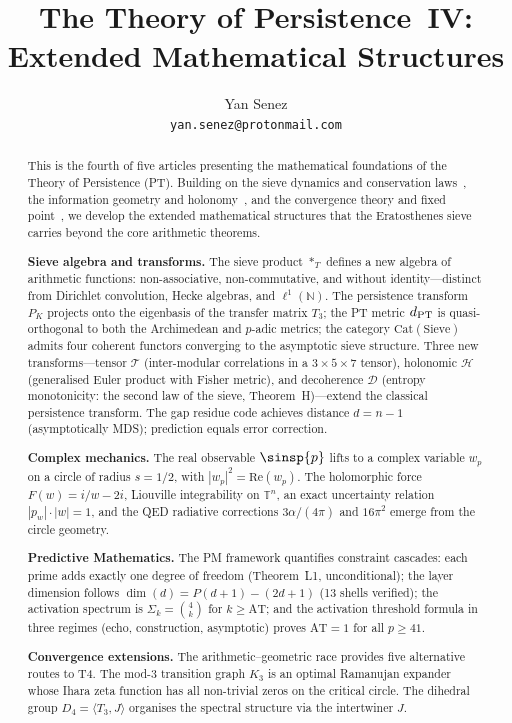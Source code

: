 \documentclass[12pt,a4paper]{article}
\title{\textbf{The Theory of Persistence~IV:\\Extended Mathematical Structures}}
\author{Yan Senez\\\texttt{yan.senez@protonmail.com}}
\date{}
\begin{document}
\maketitle

\begin{abstract}
This is the fourth of five articles presenting the mathematical
foundations of the Theory of Persistence (PT).  Building on the sieve
dynamics and conservation laws~\cite{companion_M1}, the information
geometry and holonomy~\cite{companion_M2}, and the convergence theory
and fixed point~\cite{companion_M3}, we develop the extended
mathematical structures that the Eratosthenes sieve carries beyond
the core arithmetic theorems.

\textbf{Sieve algebra and transforms.}
The sieve product $*_T$ defines a new algebra of arithmetic functions:
non-associative, non-commutative, and without identity---distinct from
Dirichlet convolution, Hecke algebras, and $\ell^1(\mathbb{N})$.  The
persistence transform $P_K$ projects onto the eigenbasis of the transfer
matrix $T_3$; the PT metric $d_{\rm PT}$ is quasi-orthogonal to both
the Archimedean and $p$-adic metrics; the category
$\mathrm{Cat}(\mathrm{Sieve})$ admits four coherent functors converging
to the asymptotic sieve structure.  Three new transforms---tensor
$\mathcal{T}$ (inter-modular correlations in a $3{\times}5{\times}7$
tensor), holonomic $\mathcal{H}$ (generalised Euler product with Fisher
metric), and decoherence $\mathcal{D}$ (entropy monotonicity: the
second law of the sieve, Theorem~H)---extend the classical persistence
transform.  The gap residue code achieves distance $d = n - 1$
(asymptotically MDS); prediction equals error correction.

\textbf{Complex mechanics.}
The real observable $\sinsp{p}$ lifts to a complex variable $w_p$ on
a circle of radius $s = 1/2$, with $|w_p|^2 = \mathrm{Re}(w_p)$.  The
holomorphic force $F(w) = i/w - 2i$, Liouville integrability on
$\mathbb{T}^n$, an exact uncertainty relation $|p_w|\cdot|w| = 1$, and
the QED radiative corrections $3\alpha/(4\pi)$ and $16\pi^2$ emerge from
the circle geometry.

\textbf{Predictive Mathematics.}
The PM framework quantifies constraint cascades: each prime adds exactly
one degree of freedom (Theorem~L1, unconditional); the layer dimension
follows $\dim(d) = P(d{+}1) - (2d{+}1)$ (13 shells verified); the
activation spectrum is $\Sigma_k = \binom{4}{k}$ for $k \geq \mathrm{AT}$;
and the activation threshold formula in three regimes (echo,
construction, asymptotic) proves $\mathrm{AT} = 1$ for all $p \geq 41$.

\textbf{Convergence extensions.}
The arithmetic--geometric race provides five alternative routes to T4.
The mod-3 transition graph $K_3$ is an optimal Ramanujan expander whose
Ihara zeta function has all non-trivial zeros on the critical circle.
The dihedral group $D_4 = \langle T_3, J \rangle$ organises the
spectral structure via the intertwiner $J$.
\end{abstract}
\end{document}
